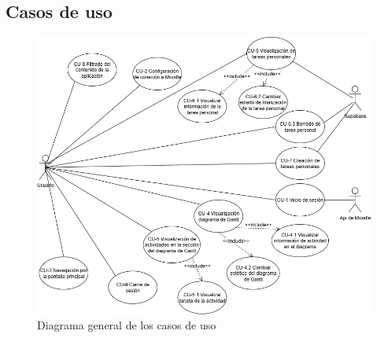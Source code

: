 \subsection{Casos de uso}
\begin{figure}[t]
    \centering
    \includegraphics[width=1.0\linewidth]{img/diagrama_casos_uso.png}
    \caption{Diagrama general de los casos de uso}
    \label{fig:diagrama_casos_uso}
\end{figure}

